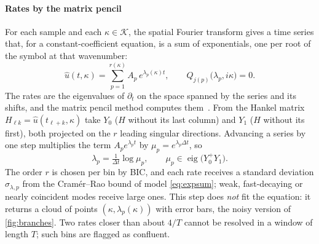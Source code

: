 \documentclass[11pt]{article}
\theoremstyle{plain}
\theoremstyle{definition}
\theoremstyle{remark}
\begin{document}
\paragraph{Rates by the matrix pencil} For each sample and each $\kappa\in\mathcal K$, the spatial Fourier transform gives
a time series that, for a constant-coefficient equation, is a sum of exponentials, one per root of the symbol at that
wavenumber:
\begin{equation}\label{eq:expsum}
  \hat u(t,\kappa)=\sum_{p=1}^{r(\kappa)}A_p\,e^{\lambda_p(\kappa)t},\qquad Q_{j(p)}\big(\lambda_p,i\kappa\big)=0 .
\end{equation}
The rates are the eigenvalues of $\partial_t$ on the space spanned by the series and its shifts, and the matrix pencil
method computes them~\cite{HuaSar90}. From the Hankel matrix $H_{\ell k}=\hat u(t_{\ell+k},\kappa)$ take $Y_0$ ($H$ without
its last column) and $Y_1$ ($H$ without its first), both projected on the $r$ leading singular directions. Advancing a
series by one step multiplies the term $A_pe^{\lambda_pt}$ by $\mu_p=e^{\lambda_p\Delta t}$, so
\begin{equation}\label{eq:pencil}
  \lambda_p=\tfrac{1}{\Delta t}\log\mu_p,\qquad \mu_p\in\operatorname{eig}\big(Y_0^{+}Y_1\big).
\end{equation}
The order $r$ is chosen per bin by BIC, and each rate receives a standard deviation $\sigma_{\lambda,p}$ from the
Cram\'er--Rao bound of model \eqref{eq:expsum}; weak, fast-decaying or nearly coincident modes receive large ones.
This step does \emph{not} fit the equation: it returns a cloud of points $(\kappa,\lambda_p(\kappa))$ with error bars, the
noisy version of \cref{fig:branches}. Two rates closer than about $4/T$ cannot be resolved in a window of length $T$; such
bins are flagged as confluent.
\end{document}
